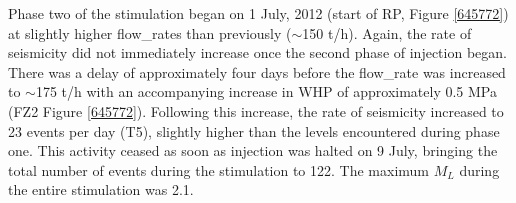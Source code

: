 Phase two of the \gls{stimulation} began on 1 July, 2012 (start of RP, Figure \ref{645772}) at slightly higher \glspl{flow_rate} than previously ($\sim$150 t/h). Again, the rate of seismicity did not immediately increase once the second phase of injection began. There was a delay of approximately four days before the \gls{flow_rate} was increased to $\sim$175 t/h with an accompanying increase in \acrshort{WHP} of approximately 0.5 MPa (FZ2 Figure \ref{645772}). Following this increase, the rate of seismicity increased to 23 events per day (T5), slightly higher than the levels encountered during phase one. This activity ceased as soon as injection was halted on 9 July, bringing the total number of events during the \gls{stimulation} to 122. The maximum $M_{L}$ during the entire \gls{stimulation} was 2.1.

